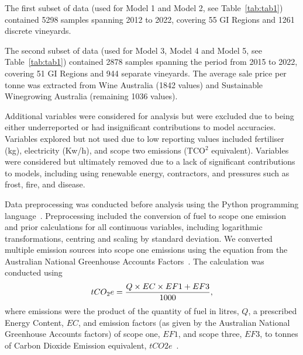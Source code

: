 \documentclass[10pt,letterpaper]{article}
\begin{document}
\par
The first subset of data (used for Model 1 and Model 2, see Table~\ref{tab:tab1}) contained 5298 samples spanning 2012 to 2022, covering 55 GI Regions and 1261 discrete vineyards.
\par
The second subset of data (used for Model 3, Model 4 and Model 5, see Table~\ref{tab:tab1}) contained 2878 samples spanning the period from 2015 to 2022, covering 51 GI Regions and 944 separate vineyards. The average sale price per tonne was extracted from Wine Australia (1842 values) and Sustainable Winegrowing Australia (remaining 1036 values).
\par
Additional variables were considered for analysis but were excluded due to being either underreported or had insignificant contributions to model accuracies. Variables explored but not used due to low reporting values included fertiliser (kg), electricity (Kw/h), and scope two emissions (TCO$^2$ equivalent). Variables were considered but ultimately removed due to a lack of significant contributions to models, including using renewable energy, contractors, and pressures such as frost, fire, and disease.
\par
Data preprocessing was conducted before analysis using the Python programming language~\cite{g.vanrossumPythonTutorialTechnical1995}. Preprocessing included the conversion of fuel to scope one emission and prior calculations for all continuous variables, including logarithmic transformations, centring and scaling by standard deviation. 
We converted multiple emission sources into scope one emissions using the equation from the Australian National Greenhouse Accounts Factors~\cite{agdeeNationalGreenhouseAccounts2021}. The calculation was conducted using
\begin{equation}
\label{(1)}
    tCO_{2}e={{Q \times EC \times EF1 + EF3}\over{1000}},
\end{equation}
where emissions were the product of the quantity of fuel in litres, $Q$, a prescribed Energy Content, $EC$, and emission factors (as given by the Australian National Greenhouse Accounts factors) of scope one, $EF1$, and scope three, $EF3$, to tonnes of Carbon Dioxide Emission equivalent, $tCO2e$~\cite{departmentofclimatechangeenergytheenvironmentandwaterAustralianNationalGreenhouse2022}.
\par
\end{document}

